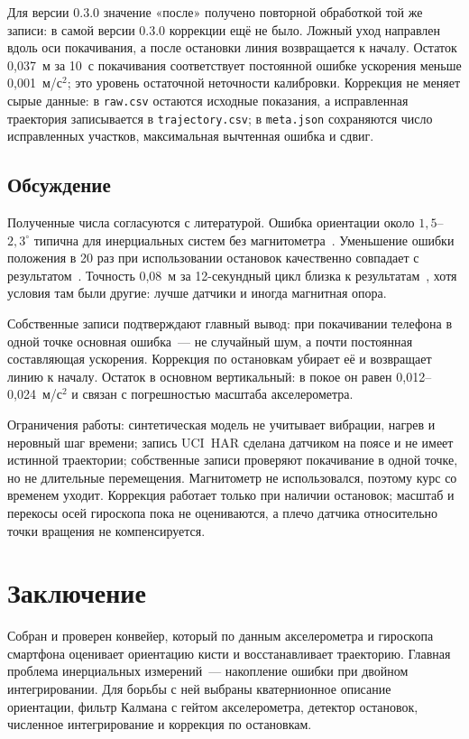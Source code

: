 \documentclass{misisarticle}
\begin{document}
Для версии 0.3.0 значение «после» получено повторной обработкой той же записи: в самой версии 0.3.0 коррекции ещё не было. Ложный уход направлен вдоль оси покачивания, а после остановки линия возвращается к началу. Остаток 0,037~м за 10~с покачивания соответствует постоянной ошибке ускорения меньше 0,001~м/с$^2$; это уровень остаточной неточности калибровки. Коррекция не меняет сырые данные: в \texttt{raw.csv} остаются исходные показания, а исправленная траектория записывается в \texttt{trajectory.csv}; в \texttt{meta.json} сохраняются число исправленных участков, максимальная вычтенная ошибка и сдвиг.

\subsection{Обсуждение}

Полученные числа согласуются с литературой. Ошибка ориентации около $1{,}5$--$2{,}3^\circ$ типична для инерциальных систем без магнитометра~\cite{woodman}. Уменьшение ошибки положения в 20 раз при использовании остановок качественно совпадает с результатом~\cite{neto}. Точность 0,08~м за 12-секундный цикл близка к результатам~\cite{neto,kortier}, хотя условия там были другие: лучше датчики и иногда магнитная опора.

Собственные записи подтверждают главный вывод: при покачивании телефона в одной точке основная ошибка~--- не случайный шум, а почти постоянная составляющая ускорения. Коррекция по остановкам убирает её и возвращает линию к началу. Остаток в основном вертикальный: в покое он равен 0,012--0,024~м/с$^2$ и связан с погрешностью масштаба акселерометра.

Ограничения работы: синтетическая модель не учитывает вибрации, нагрев и неровный шаг времени; запись UCI~HAR сделана датчиком на поясе и не имеет истинной траектории; собственные записи проверяют покачивание в одной точке, но не длительные перемещения. Магнитометр не использовался, поэтому курс со временем уходит. Коррекция работает только при наличии остановок; масштаб и перекосы осей гироскопа пока не оцениваются, а плечо датчика относительно точки вращения не компенсируется.

\section{Заключение}

Собран и проверен конвейер, который по данным акселерометра и гироскопа смартфона оценивает ориентацию кисти и восстанавливает траекторию. Главная проблема инерциальных измерений~--- накопление ошибки при двойном интегрировании. Для борьбы с ней выбраны кватернионное описание ориентации, фильтр Калмана с гейтом акселерометра, детектор остановок, численное интегрирование и коррекция по остановкам.
\end{document}
